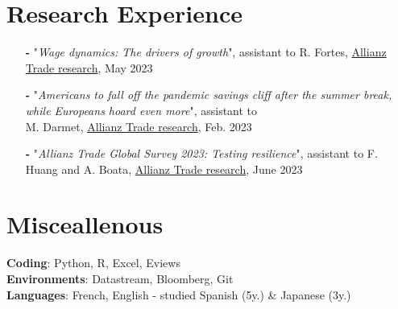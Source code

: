 \documentclass[letterpaper,10pt]{article}
\makeatletter
\newcommand{\up}[1]{\textsuperscript{#1}}
\newcommand{\resumeItem}[1]{
    \item\small{
            {#1 \vspace{-2pt}}
    }
}
\newcommand{\resumeSubheading}[4]{
    \vspace{-2pt}\item
    \begin{tabular*}{0.97\textwidth}[t]{l@{\extracolsep{\fill}}r}
        \textbf{#1}       & #2                 \\
        \textit{\small#3} & \textit{\small #4} \\
    \end{tabular*}\vspace{-7pt}
}
\newcommand{\resumeSubHeadingListStart}{\begin{itemize}[leftmargin=0.15in, label={}]}
\newcommand{\resumeSubHeadingListEnd}{\end{itemize}}
\newcommand{\resumeItemListStart}{\begin{itemize}}
\newcommand{\resumeItemListEnd}{\end{itemize}\vspace{-5pt}}
\makeatother
\begin{document}
\section{Research Experience}
\begin{itemize}
    Research experience
    \item[\textbf{-}] \small{"\textit{Wage dynamics: The drivers of growth}", assistant to R. Fortes, \textcolor{blue(pigment)}{\href{https://www.allianz.com/content/dam/onemarketing/azcom/Allianz_com/economic-research/publications/specials/en/2023/may/2023-05-03-LaborMarkets.pdf}{Allianz Trade research}}, May 2023}
    \item[\textbf{-}] \small{"\textit{Americans to fall off the pandemic savings cliff after the summer break, while Europeans hoard even more}", assistant to \\M. Darmet, \textcolor{blue(pigment)}{\href{https://www.allianz-trade.com/content/dam/onemarketing/aztrade/allianz-trade_com/en_gl/erd/publications/pdf/2023_02_02_excess_savings.pdf}{Allianz Trade research}}, Feb. 2023}
    \item[\textbf{-}] \small{"\textit{Allianz Trade Global Survey 2023: Testing resilience}", assistant to F. Huang and A. Boata, \textcolor{blue(pigment)}{\href{https://www.allianz.com/content/dam/onemarketing/azcom/Allianz_com/economic-research/publications/specials/en/2023/june/2023_06_01_TRADE-SURVEY23_AZ.pdf}{Allianz Trade research}}, June 2023}
\end{itemize}

\section{Misceallenous}
\begin{itemize}[leftmargin=0.15in, label={}]
\small{\item{
\textbf{Coding}{: Python, R, Excel, Eviews} \\
\textbf{Environments}{: Datastream, Bloomberg, Git}\\
\textbf{Languages}{: French, English - studied Spanish (5y.) \& Japanese (3y.)} \\
}}
\end{itemize}
\end{document}
